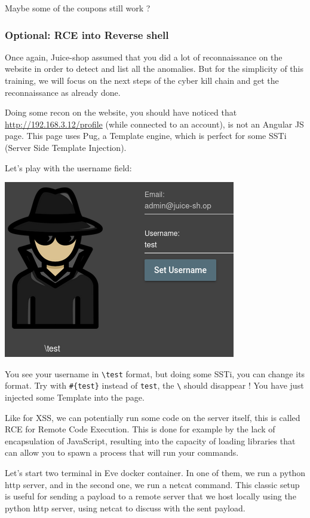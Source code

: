 \documentclass[a4paper,11pt,singlespacing]{article}
\begin{document}
Maybe some of the coupons still work ?

\subsubsection{Optional: RCE into Reverse
shell}\label{optional-rce-into-reverse-shell}

Once again, Juice-shop assumed that you did a lot of reconnaissance on
the website in order to detect and list all the anomalies. But for the
simplicity of this training, we will focus on the next steps of the
cyber kill chain and get the reconnaissance as already done.

Doing some recon on the website, you should have noticed that
\url{http://192.168.3.12/profile} (while connected to an account), is
not an Angular JS page. This page uses Pug, a Template engine, which is
perfect for some SSTi (Server Side Template Injection).

\newpage 

Let's play with the username field:

\includegraphics{Images/Image23.png}

You see your username in \texttt{\textbackslash{}test} format, but doing
some SSTi, you can change its format. Try with \texttt{\#\{test\}}
instead of \texttt{test}, the \texttt{\textbackslash{}} should disappear
! You have just injected some Template into the page.

Like for XSS, we can potentially run some code on the server itself,
this is called RCE for Remote Code Execution. This is done for example
by the lack of encapsulation of JavaScript, resulting into the capacity
of loading libraries that can allow you to spawn a process that will run
your commands.

Let's start two terminal in Eve docker container. In one of them, we run
a python http server, and in the second one, we run a netcat command.
This classic setup is useful for sending a payload to a remote server
that we host locally using the python http server, using netcat to
discuss with the sent payload.
\end{document}
